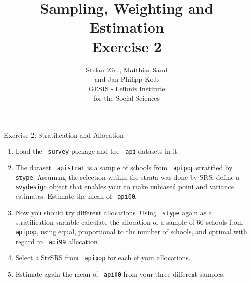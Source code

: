 \documentclass[11pt,german,hideothersubsections]{beamer}\usepackage[]{graphicx}\usepackage[]{color}
\title[Day 1]{Sampling, Weighting and Estimation\\ \Large{Exercise 2} }
\author[M. Sand]{Stefan Zins, Matthias Sand\\ and Jan-Philipp Kolb\\ \vspace{.5cm} \footnotesize{GESIS - Leibniz Institute\\ for the Social Sciences}}
\newcommand{\R}[1]{{\tt \color{blue}  #1}}
\begin{document}
\maketitle

\begin{frame}[fragile]{Exercise 2: Stratification and Allocation}

\begin{enumerate}
\item Load the \R{survey} package and the \R{api} datasets in it.
\item The dataset \R{apistrat} is a sample of schools from \R{apipop} stratified by \R{stype}. Assuming the selection within the strata was done by SRS, define a \R{svydesign} object that enables your to make unbiased point and variance estimates. Estimate the mean of \R{api00}.
\item Now you should try different allocations. Using \R{stype} again as a stratification variable calculate the allocation of a sample of 60 schools from \R{apipop}, using equal, proportional to the number of schools, and optimal with regard to \R{api99} allocation.
\item Select a StrSRS from \R{apipop} for each of your allocations.
\item Estimate again the mean of \R{api00} from your three different samples.

\end{enumerate}

\end{frame}
\end{document}
